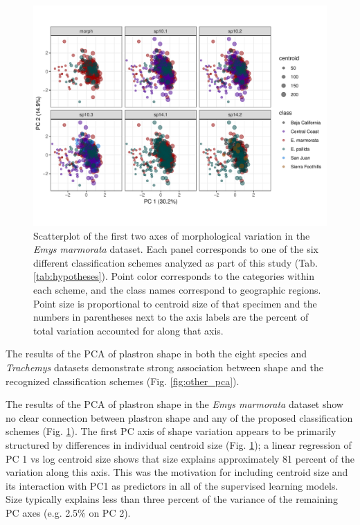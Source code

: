 \documentclass[10pt,letterpaper]{article}
\begin{document}
\afterpage{\clearpage}
\begin{figure}[ht]
  \centering
  \includegraphics[height = \textheight, width = \textwidth, keepaspectratio = true]{figure/emys_pc_graph}
  \caption{Scatterplot of the first two axes of morphological variation in the \textit{Emys marmorata} dataset. Each panel corresponds to one of the six different classification schemes analyzed as part of this study (Tab. \ref{tab:hypotheses}). Point color corresponds to the categories within each scheme, and the class names correspond to geographic regions. Point size is proportional to centroid size of that specimen and the numbers in parentheses next to the axis labels are the percent of total variation accounted for along that axis.}
  \label{fig:emys_pca}
\end{figure}

The results of the PCA of plastron shape in both the eight species and \textit{Trachemys} datasets demonstrate strong association between shape and the recognized classification schemes (Fig. \ref{fig:other_pca}).

The results of the PCA of plastron shape in the \textit{Emys marmorata} dataset show no clear connection between plastron shape and any of the proposed classification schemes (Fig. \ref{fig:emys_pca}). The first PC axis of shape variation appears to be primarily structured by differences in individual centroid size (Fig. \ref{fig:emys_pca}); a linear regression of PC 1 vs log centroid size shows that size explains approximately 81 percent of the variation along this axis. This was the motivation for including centroid size and its interaction with PC1 as predictors in all of the supervised learning models. Size typically explains less than three percent of the variance of the remaining PC axes (e.g. 2.5\% on PC 2).
\end{document}
